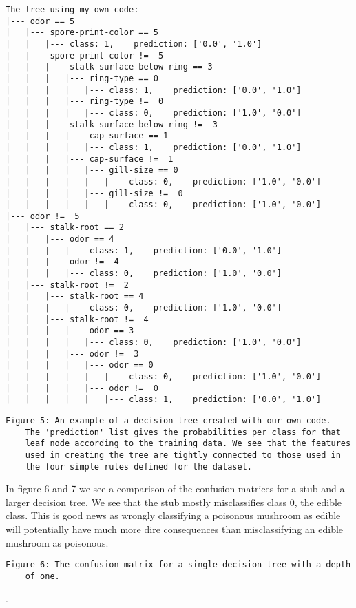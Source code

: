 \documentclass[11pt]{article}
\begin{document}
\begin{BVerbatim}
The tree using my own code:
|--- odor == 5
|   |--- spore-print-color == 5
|   |   |--- class: 1,    prediction: ['0.0', '1.0']
|   |--- spore-print-color !=  5
|   |   |--- stalk-surface-below-ring == 3
|   |   |   |--- ring-type == 0
|   |   |   |   |--- class: 1,    prediction: ['0.0', '1.0']
|   |   |   |--- ring-type !=  0
|   |   |   |   |--- class: 0,    prediction: ['1.0', '0.0']
|   |   |--- stalk-surface-below-ring !=  3
|   |   |   |--- cap-surface == 1
|   |   |   |   |--- class: 1,    prediction: ['0.0', '1.0']
|   |   |   |--- cap-surface !=  1
|   |   |   |   |--- gill-size == 0
|   |   |   |   |   |--- class: 0,    prediction: ['1.0', '0.0']
|   |   |   |   |--- gill-size !=  0
|   |   |   |   |   |--- class: 0,    prediction: ['1.0', '0.0']
|--- odor !=  5
|   |--- stalk-root == 2
|   |   |--- odor == 4
|   |   |   |--- class: 1,    prediction: ['0.0', '1.0']
|   |   |--- odor !=  4
|   |   |   |--- class: 0,    prediction: ['1.0', '0.0']
|   |--- stalk-root !=  2
|   |   |--- stalk-root == 4
|   |   |   |--- class: 0,    prediction: ['1.0', '0.0']
|   |   |--- stalk-root !=  4
|   |   |   |--- odor == 3
|   |   |   |   |--- class: 0,    prediction: ['1.0', '0.0']
|   |   |   |--- odor !=  3
|   |   |   |   |--- odor == 0
|   |   |   |   |   |--- class: 0,    prediction: ['1.0', '0.0']
|   |   |   |   |--- odor !=  0
|   |   |   |   |   |--- class: 1,    prediction: ['0.0', '1.0']	
\end{BVerbatim}
\begin{Verbatim}[commandchars=\\\{\}]
	Figure 5: An example of a decision tree created with our own code. 
	The 'prediction' list gives the probabilities per class for that 
	leaf node according to the training data. We see that the features 
	used in creating the tree are tightly connected to those used in 
	the four simple rules defined for the dataset.
\end{Verbatim}


In figure 6 and 7 we see a comparison of the confusion matrices for a stub and a larger decision tree. We see that the stub mostly misclassifies class 0, the edible class. This is good news as wrongly classifying a poisonous mushroom as edible will potentially have much more dire consequences than misclassifying an edible mushroom as poisonous.

\begin{center}
\end{center}
\begin{Verbatim}[commandchars=\\\{\}]
	Figure 6: The confusion matrix for a single decision tree with a depth 
	of one.
\end{Verbatim}
.
\end{document}
